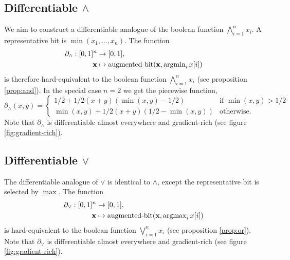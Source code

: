 \documentclass{article} %
\begin{document}
\subsection{Differentiable $\wedge$}

We aim to construct a differentiable analogue of the boolean function $\bigwedge_{i=1}^{n} x_i$. A representative bit is $\operatorname{min}(x_{1},\dots,x_{n})$. The function
\begin{equation*}
\begin{aligned}
\partial_{\wedge}: [0,1]^{n} &\to [0,1], \\
{\bf x} &\mapsto \operatorname{augmented-bit}({\bf x}, \operatorname{argmin}\limits_{i} x[i])
\end{aligned}
\end{equation*}
is therefore hard-equivalent to the boolean function $\bigwedge_{i=1}^{n} x_i$ (see proposition \ref{prop:and}). In the special case $n=2$ we get the piecewise function,
\begin{equation*}
\partial_{\wedge}\!(x, y) =
	\begin{cases}
	1/2 + 1/2(x + y)(\operatorname{min}(x,y) - 1/2) & \text{if } \operatorname{min}(x,y) > 1/2 \\
	\operatorname{min}(x,y) + 1/2(x + y)(1/2 - \operatorname{min}(x,y)) & \text{otherwise.}
	\end{cases}
\end{equation*}
Note that $\partial_{\wedge}$ is differentiable almost everywhere and gradient-rich (see figure \ref{fig:gradient-rich}).

\subsection{Differentiable $\vee$}

The differentiable analogue of $\vee$ is identical to $\wedge$, except the representative bit is selected by $\operatorname{max}$. The function
\begin{equation*}
\begin{aligned}
\partial_{\vee}: [0,1]^{n} &\to [0,1], \\
{\bf x} &\mapsto \operatorname{augmented-bit}({\bf x}, \operatorname{argmax}\limits_{i} x[i])
\end{aligned}
\end{equation*}
is hard-equivalent to the boolean function $\bigvee_{i=1}^{n} x_i$ (see proposition \ref{prop:or}). Note that $\partial_{\vee}$ is differentiable almost everywhere and gradient-rich (see figure \ref{fig:gradient-rich}).
\end{document}
